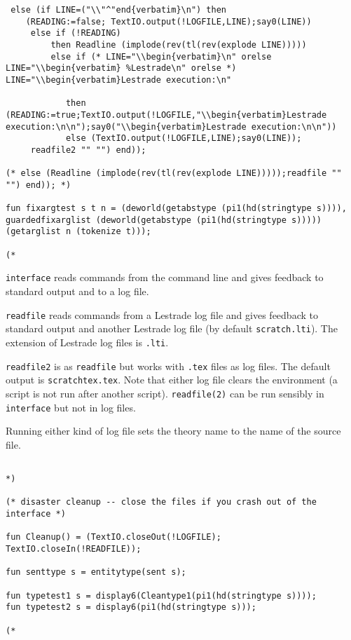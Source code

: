 \documentclass{article}
\begin{document}
\begin{verbatim}
 else (if LINE=("\\"^"end{verbatim}\n") then 
    (READING:=false; TextIO.output(!LOGFILE,LINE);say0(LINE))
     else if (!READING) 
         then Readline (implode(rev(tl(rev(explode LINE))))) 
         else if (* LINE="\\begin{verbatim}\n" orelse  LINE="\\begin{verbatim} %Lestrade\n" orelse *)  LINE="\\begin{verbatim}Lestrade execution:\n"

            then (READING:=true;TextIO.output(!LOGFILE,"\\begin{verbatim}Lestrade execution:\n\n");say0("\\begin{verbatim}Lestrade execution:\n\n"))
            else (TextIO.output(!LOGFILE,LINE);say0(LINE));
     readfile2 "" "") end)); 

(* else (Readline (implode(rev(tl(rev(explode LINE)))));readfile "" "") end)); *)

fun fixargtest s t n = (deworld(getabstype (pi1(hd(stringtype s)))),
guardedfixarglist (deworld(getabstype (pi1(hd(stringtype s))))) 
(getarglist n (tokenize t)));

(*

\end{verbatim}

{\tt interface} reads commands from the command line and gives feedback to standard output and to a log file.

{\tt readfile} reads commands from a Lestrade log file and gives feedback to standard output and another Lestrade log file (by default {\tt scratch.lti}).
The extension of Lestrade log files is {\tt .lti}.

{\tt readfile2} is as {\tt readfile} but works with {\tt .tex} files as log files.  The default output is {\tt scratchtex.tex}.  Note that either
log file clears the environment (a script is not run after another script).  {\tt readfile(2)} can be run sensibly in {\tt interface} but not in log files.

Running either kind of log file sets the theory name to the name of the source file.

\begin{verbatim}

*)

(* disaster cleanup -- close the files if you crash out of the interface *)

fun Cleanup() = (TextIO.closeOut(!LOGFILE); TextIO.closeIn(!READFILE));

fun senttype s = entitytype(sent s);

fun typetest1 s = display6(Cleantype1(pi1(hd(stringtype s))));
fun typetest2 s = display6(pi1(hd(stringtype s)));

(*

\end{verbatim}
\end{document}
